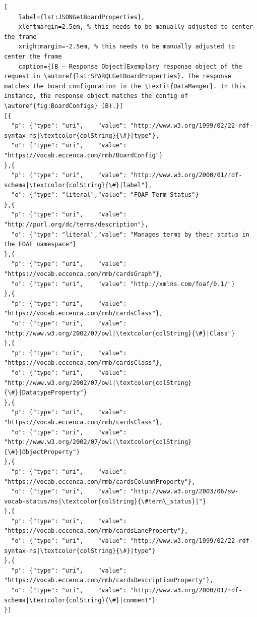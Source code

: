 \begin{spacing}{0.9}
    \lstset{language=JavaScript,escapechar=|}
    \begin{lstlisting}[
    label={lst:JSONGetBoardProperties},
    xleftmargin=2.5em, % this needs to be manually adjusted to center the frame
    xrightmargin=-2.5em, % this needs to be manually adjusted to center the frame
    caption={[B — Response Object]Exemplary response object of the request in \autoref{lst:SPARQLGetBoardProperties}. The response matches the board configuration in the \textit{DataManger}. In this instance, the response object matches the config of \autoref{fig:BoardConfigs} (B).}]
[{
  "p": {"type": "uri",    "value": "http://www.w3.org/1999/02/22-rdf-syntax-ns|\textcolor{colString}{\#}|type"},
  "o": {"type": "uri",    "value": "https://vocab.eccenca.com/rmb/BoardConfig"}
},{
  "p": {"type": "uri",    "value": "http://www.w3.org/2000/01/rdf-schema|\textcolor{colString}{\#}|label"},
  "o": {"type": "literal","value": "FOAF Term Status"}
},{
  "p": {"type": "uri",    "value": "http://purl.org/dc/terms/description"},
  "o": {"type": "literal","value": "Manages terms by their status in the FOAF namespace"}
},{
  "p": {"type": "uri",    "value": "https://vocab.eccenca.com/rmb/cardsGraph"},
  "o": {"type": "uri",    "value": "http://xmlns.com/foaf/0.1/"}
},{
  "p": {"type": "uri",    "value": "https://vocab.eccenca.com/rmb/cardsClass"},
  "o": {"type": "uri",    "value": "http://www.w3.org/2002/07/owl|\textcolor{colString}{\#}|Class"}
},{
  "p": {"type": "uri",    "value": "https://vocab.eccenca.com/rmb/cardsClass"},
  "o": {"type": "uri",    "value": "http://www.w3.org/2002/07/owl|\textcolor{colString}{\#}|DatatypeProperty"}
},{
  "p": {"type": "uri",    "value": "https://vocab.eccenca.com/rmb/cardsClass"},
  "o": {"type": "uri",    "value": "http://www.w3.org/2002/07/owl|\textcolor{colString}{\#}|ObjectProperty"}
},{
  "p": {"type": "uri",    "value": "https://vocab.eccenca.com/rmb/cardsColumnProperty"},
  "o": {"type": "uri",    "value": "http://www.w3.org/2003/06/sw-vocab-status/ns|\textcolor{colString}{\#term\_status}|"}
},{
  "p": {"type": "uri",    "value": "https://vocab.eccenca.com/rmb/cardsLaneProperty"},
  "o": {"type": "uri",    "value": "http://www.w3.org/1999/02/22-rdf-syntax-ns|\textcolor{colString}{\#}|type"}
},{
  "p": {"type": "uri",    "value": "https://vocab.eccenca.com/rmb/cardsDescriptionProperty"},
  "o": {"type": "uri",    "value": "http://www.w3.org/2000/01/rdf-schema|\textcolor{colString}{\#}|comment"}
}]
\end{lstlisting}
\end{spacing}


